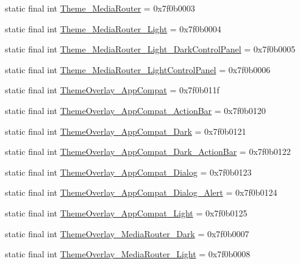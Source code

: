 \begin{CompactItemize}
\item 
static final int \hyperlink{classandroid_1_1support_1_1coreutils_1_1_r_1_1style_2dc043315162adcd87e26e2744a64a3c}{Theme\_\-MediaRouter} = 0x7f0b0003
\item 
static final int \hyperlink{classandroid_1_1support_1_1coreutils_1_1_r_1_1style_9b7b8a5ef480b32c481c8e1e76947b82}{Theme\_\-MediaRouter\_\-Light} = 0x7f0b0004
\item 
static final int \hyperlink{classandroid_1_1support_1_1coreutils_1_1_r_1_1style_99ace2acef05963fb3e595b35dca687c}{Theme\_\-MediaRouter\_\-Light\_\-DarkControlPanel} = 0x7f0b0005
\item 
static final int \hyperlink{classandroid_1_1support_1_1coreutils_1_1_r_1_1style_ed1b114d2829227e549efef0ad0b1d8e}{Theme\_\-MediaRouter\_\-LightControlPanel} = 0x7f0b0006
\item 
static final int \hyperlink{classandroid_1_1support_1_1coreutils_1_1_r_1_1style_bad6760641e5717877b08999623af355}{ThemeOverlay\_\-AppCompat} = 0x7f0b011f
\item 
static final int \hyperlink{classandroid_1_1support_1_1coreutils_1_1_r_1_1style_d6aed69ecffbcbc8b06f0305b19dab65}{ThemeOverlay\_\-AppCompat\_\-ActionBar} = 0x7f0b0120
\item 
static final int \hyperlink{classandroid_1_1support_1_1coreutils_1_1_r_1_1style_1eb2555565e4d10cdc813688081f5b43}{ThemeOverlay\_\-AppCompat\_\-Dark} = 0x7f0b0121
\item 
static final int \hyperlink{classandroid_1_1support_1_1coreutils_1_1_r_1_1style_ca141da843cc48b0fc44435e73c65819}{ThemeOverlay\_\-AppCompat\_\-Dark\_\-ActionBar} = 0x7f0b0122
\item 
static final int \hyperlink{classandroid_1_1support_1_1coreutils_1_1_r_1_1style_918715db16bd46b92e16fec794957b61}{ThemeOverlay\_\-AppCompat\_\-Dialog} = 0x7f0b0123
\item 
static final int \hyperlink{classandroid_1_1support_1_1coreutils_1_1_r_1_1style_961a77a998bd5000d7ec60b73038eb25}{ThemeOverlay\_\-AppCompat\_\-Dialog\_\-Alert} = 0x7f0b0124
\item 
static final int \hyperlink{classandroid_1_1support_1_1coreutils_1_1_r_1_1style_661c55bd6daca06d38e38dea979a8723}{ThemeOverlay\_\-AppCompat\_\-Light} = 0x7f0b0125
\item 
static final int \hyperlink{classandroid_1_1support_1_1coreutils_1_1_r_1_1style_db4c48aed220f8a35bc6c76cda1e825e}{ThemeOverlay\_\-MediaRouter\_\-Dark} = 0x7f0b0007
\item 
static final int \hyperlink{classandroid_1_1support_1_1coreutils_1_1_r_1_1style_c2342a9a72c42ce02097186786a9757c}{ThemeOverlay\_\-MediaRouter\_\-Light} = 0x7f0b0008

\end{CompactItemize}
